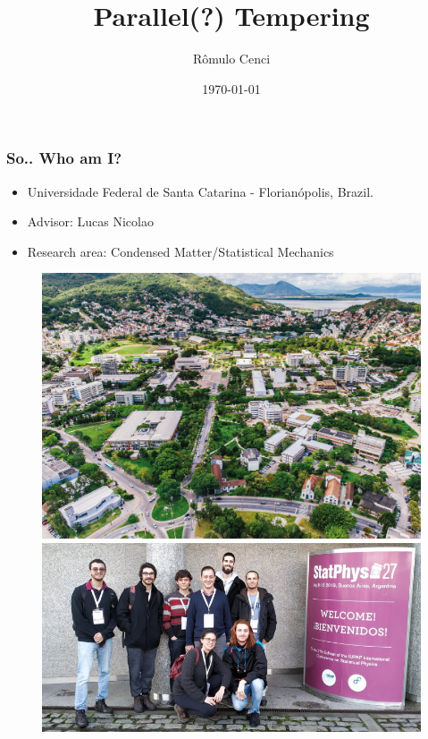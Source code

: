 \documentclass{beamer}
\title{Parallel(?) Tempering}
\author{Rômulo Cenci}
\date{\today}
\begin{document}
\frame{\titlepage}

\begin{frame}
  \frametitle{So.. Who am I?}
  \begin{itemize}
  \item Universidade Federal de Santa Catarina - Florianópolis, Brazil.
  \item Advisor: Lucas Nicolao
  \item Research area: Condensed Matter/Statistical Mechanics
  \end{itemize}
  \begin{figure}[h!]
    \centering
    \includegraphics[scale=0.5]{Imagens/UFSC.jpg}
    \includegraphics[scale=0.3]{Imagens/group.jpg}
  \end{figure}



\end{frame}
\end{document}

